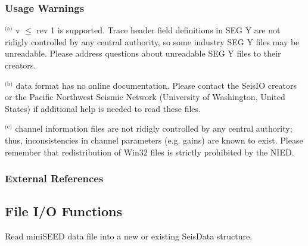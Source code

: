 \documentclass[letterpaper,11pt,english]{sphinxmanual}
\begin{document}
\subsubsection{Usage Warnings}
\label{\detokenize{src/Formats/fileformats:usage-warnings}}
$^{\text{(a)}}$   v \(\le\) rev 1 is supported. Trace header field
definitions in SEG Y are not ridigly controlled by any central authority, so
some industry SEG Y files may be unreadable. Please address questions about
unreadable SEG Y files to their creators.

$^{\text{(b)}}$   data format has no online documentation. Please contact the SeisIO creators or the Pacific Northwest Seismic Network (University of Washington, United States) if additional help is needed to read these files.

$^{\text{(c)}}$   channel information files are not ridigly controlled by any central authority; thus, inconsistencies in channel parameters (e.g. gains) are known to exist. Please remember that redistribution of Win32 files is strictly prohibited by the NIED.
\subsubsection*{External References}


\subsection{File I/O Functions}
\label{\detokenize{src/Formats/fileformats:file-i-o-functions}}

\begin{fulllineitems}
\label{\detokenize{src/Formats/fileformats:readmseed}}
\end{fulllineitems}



\begin{fulllineitems}
\end{fulllineitems}


Read miniSEED data file  into a new or existing SeisData structure.

\begin{fulllineitems}
\label{\detokenize{src/Formats/fileformats:readsac}}
\end{fulllineitems}
\end{document}
